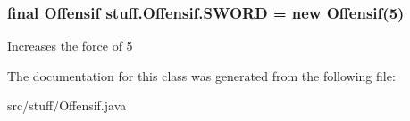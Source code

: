 \subsubsection[{\texorpdfstring{S\+W\+O\+RD}{SWORD}}]{\setlength{\rightskip}{0pt plus 5cm}final {\bf Offensif} stuff.\+Offensif.\+S\+W\+O\+RD = new {\bf Offensif}(5)\hspace{0.3cm}{\ttfamily [static]}}\hypertarget{classstuff_1_1_offensif_a68a5dd4dd902fea924cc35f037bc0e0f}{}\label{classstuff_1_1_offensif_a68a5dd4dd902fea924cc35f037bc0e0f}
Increases the force of 5 

The documentation for this class was generated from the following file\+:\begin{DoxyCompactItemize}
\item 
src/stuff/Offensif.\+java\end{DoxyCompactItemize}
